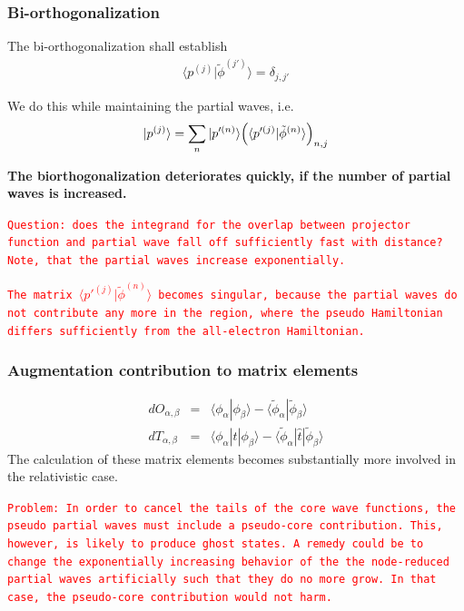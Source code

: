 \documentclass[11pt,a4paper]{report}
\newcommand{\petertt}[1]{\textcolor{red}{\texttt{#1}}}
\begin{document}
\subsubsection{Bi-orthogonalization}
The bi-orthogonalization shall establish 
\begin{eqnarray}
\langle p^{(j)}|\tilde{\phi}^{(j')}\rangle=\delta_{j,j'}
\end{eqnarray}

We do this while maintaining the partial waves, i.e.
\begin{eqnarray}
|p^{(j)}\rangle=\sum_{n}|p'^{(n)}\rangle
\Bigl(\langle p'^{(j)}|\tilde{\phi}^{(n)}\rangle\Bigr)_{n,j}
\end{eqnarray}

\textbf{The biorthogonalization deteriorates quickly, if the number of
  partial waves is increased.}

\petertt{Question: does the integrand for the overlap between
  projector function and partial wave fall off sufficiently fast with
  distance? Note, that the partial waves increase exponentially.}

\petertt{The matrix $\langle p'^{(j)}|\tilde{\phi}^{(n)}\rangle$
  becomes singular, because the partial waves do not contribute any
  more in the region, where the pseudo Hamiltonian differs
  sufficiently from the all-electron Hamiltonian.}


\subsubsection{Augmentation contribution to matrix elements}
\begin{eqnarray}
dO_{\alpha,\beta}&=&\langle\phi_\alpha|\phi_\beta\rangle-
\langle\tilde{\phi}_\alpha|\tilde{\phi}_\beta\rangle
\nonumber\\
dT_{\alpha,\beta}&=&\langle\phi_\alpha|\hat{t}|\phi_\beta\rangle-
\langle\tilde{\phi}_\alpha|\hat{t}|\tilde{\phi}_\beta\rangle
\end{eqnarray}
The calculation of these matrix elements becomes substantially more
involved in the relativistic case.

\petertt{Problem: In order to cancel the tails of the core wave
  functions, the pseudo partial waves must include a pseudo-core
  contribution. This, however, is likely to produce ghost states. A
  remedy could be to change the exponentially increasing behavior of
  the the node-reduced partial waves artificially such that they do no
  more grow. In that case, the pseudo-core contribution would not harm.}
\end{document}
